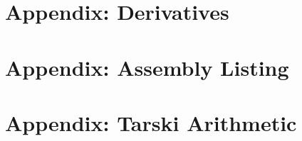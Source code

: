 \documentclass[cup9a]{cupbook}
\def\skipXX#1{}
\begin{document}

    
    \label{part:appendix}
    \chapter{Appendix: Derivatives}
    \skipXX{} %
    \chapter{Appendix: Assembly Listing}
    \skipXX{} %
    \chapter{Appendix: Tarski Arithmetic}
\end{document}
